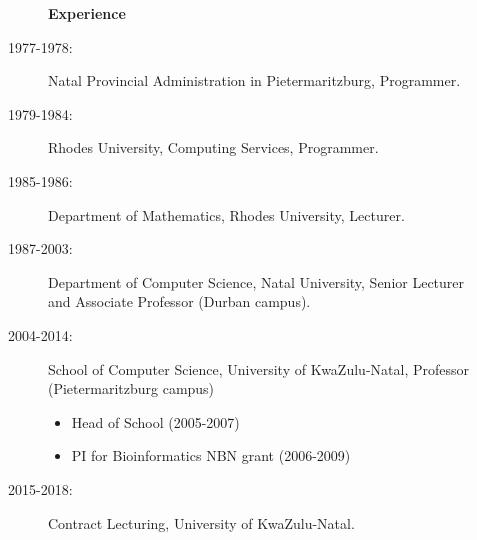 \documentclass[12pt]{article}
\begin{document}
\begin{multicols}{2}
\begin{description}
\item[] \begin{description}
\item[] {\large \bf Experience}
\item[1977-1978:]
Natal Provincial Administration in Pietermaritzburg, Programmer. 
\item[1979-1984:]
Rhodes University, Computing Services, Programmer.  
\item[1985-1986:]
Department of Mathematics, Rhodes University, Lecturer. 
\item[1987-2003:]
Department of Computer Science, Natal University, \newline
Senior Lecturer and Associate Professor (Durban campus). 
\item[2004-2014:]
School of Computer Science, University of KwaZulu-Natal,  \newline
Professor (Pietermaritzburg campus)
\begin{itemize}
\item  Head of School (2005-2007)
\item  PI for Bioinformatics NBN grant (2006-2009)
\end{itemize}
\item[2015-2018:]
Contract Lecturing, University of KwaZulu-Natal.
\end{description}
\end{description}

\end{multicols}
\end{document}
